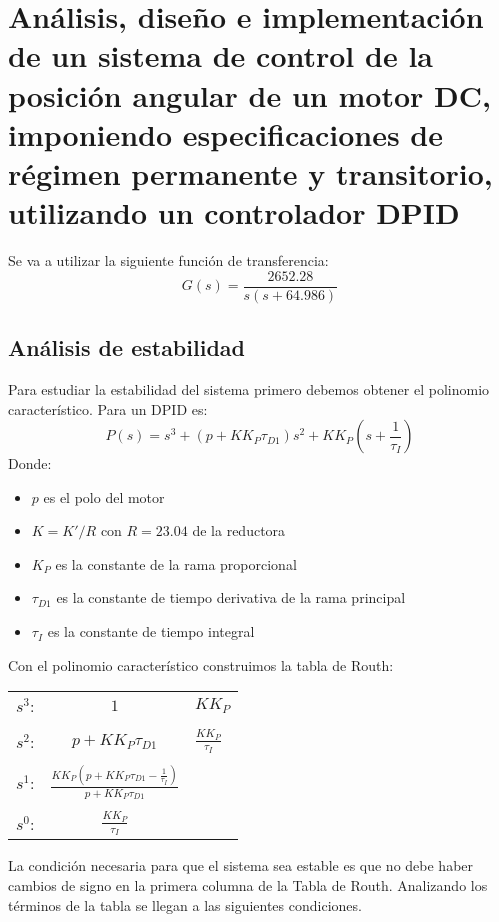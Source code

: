 \documentclass[a4paper]{article}
\begin{document}
\section{Análisis, diseño e implementación de un sistema de control de la posición angular de un motor DC, imponiendo especificaciones de régimen permanente y transitorio, utilizando un controlador D\textbar PID}
Se va a utilizar la siguiente función de transferencia:
\begin{equation}
G(s)=\frac{2652.28}{s(s+64.986)}
\end{equation}
\subsection{Análisis de estabilidad \label{estabilidad}}
Para estudiar la estabilidad del sistema primero debemos obtener el polinomio característico. Para un D\textbar PID es:
\begin{equation}
P(s)=s^3+(p+K K_P\tau_{D1})s^2+K K_P(s+\frac{1}{\tau_I})
\end{equation}
Donde:
\begin{itemize}
	\item $p$ es el polo del motor
	\item $K=K'/R$ con $R=23.04$ de la reductora
	\item $K_P$ es la constante de la rama proporcional
	\item $\tau_{D1}$ es la constante de tiempo derivativa de la rama principal
	\item $\tau_I$ es la constante de tiempo integral
\end{itemize}

Con el polinomio característico construimos la tabla de Routh:

\begin{tabular}{ccl}
	$s^3$: & $1$ & $K K_P$ \\ \\
	$s^2$: & $p+K K_P \tau_{D1}$ & $\displaystyle\frac{K K_P}{\tau_I}$ \\ \\
	$s^1$: & $\displaystyle\frac{K K_P (p+K K_P \tau_{D1} -\frac{1}{\tau_I})}{p+K K_P \tau_{D1}}$ & \\ \\
	$s^0$: & $\displaystyle\frac{K K_P}{\tau_I}$ &
\end{tabular}


La condición necesaria para que el sistema sea estable es que no debe haber cambios de signo en la primera columna de la Tabla de Routh. Analizando los términos de la tabla se llegan a las siguientes condiciones.
\end{document}
